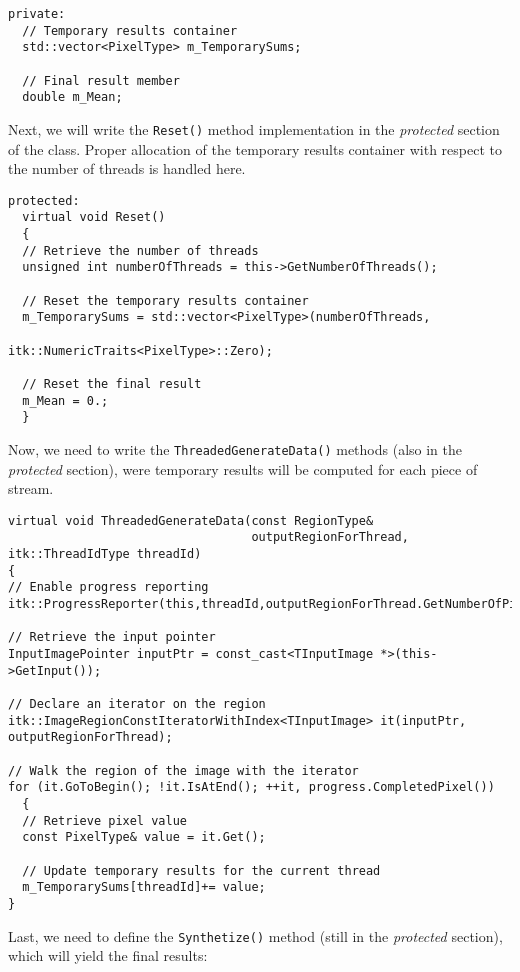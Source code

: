 \begin{verbatim}
private:
  // Temporary results container
  std::vector<PixelType> m_TemporarySums;

  // Final result member
  double m_Mean;
\end{verbatim}

Next, we will write the \verb?Reset()? method implementation in the
\emph{protected} section of the class. Proper allocation of the
temporary results container with respect to the number of threads is
handled here.


\begin{verbatim}
protected:
  virtual void Reset()
  {
  // Retrieve the number of threads
  unsigned int numberOfThreads = this->GetNumberOfThreads();

  // Reset the temporary results container
  m_TemporarySums = std::vector<PixelType>(numberOfThreads,
                                           itk::NumericTraits<PixelType>::Zero);

  // Reset the final result
  m_Mean = 0.;
  }
\end{verbatim}

Now, we need to write the \verb?ThreadedGenerateData()? methods (also
in the \emph{protected} section), were
temporary results will be computed for each piece of stream.

\begin{verbatim}
virtual void ThreadedGenerateData(const RegionType&
                                  outputRegionForThread, itk::ThreadIdType threadId)
{
// Enable progress reporting
itk::ProgressReporter(this,threadId,outputRegionForThread.GetNumberOfPixels());

// Retrieve the input pointer
InputImagePointer inputPtr = const_cast<TInputImage *>(this->GetInput());

// Declare an iterator on the region
itk::ImageRegionConstIteratorWithIndex<TInputImage> it(inputPtr,
outputRegionForThread);

// Walk the region of the image with the iterator
for (it.GoToBegin(); !it.IsAtEnd(); ++it, progress.CompletedPixel())
  {
  // Retrieve pixel value
  const PixelType& value = it.Get();

  // Update temporary results for the current thread
  m_TemporarySums[threadId]+= value;
}

\end{verbatim}

Last, we need to define the \verb?Synthetize()? method (still in the
\emph{protected} section), which will yield the final results:

